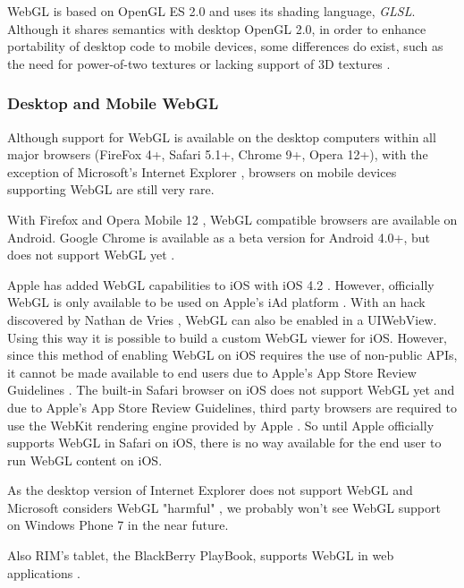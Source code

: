 \documentclass[12pt,journal,compsoc]{IEEEtran}
\begin{document}
WebGL is based on OpenGL ES 2.0 and uses its shading language, \textit{GLSL}. Although it shares semantics with desktop OpenGL 2.0, in order  to enhance portability of desktop code to mobile devices, some differences do exist, such as the need for power-of-two textures or lacking support of 3D textures \cite{KhronosDiff}.

\subsubsection{Desktop and Mobile WebGL}

Although support for WebGL is available on the desktop computers within all major browsers (FireFox 4+, Safari 5.1+, Chrome 9+, Opera 12+), with the exception of Microsoft's Internet Explorer \cite{Golubovic2011}, browsers on mobile devices supporting WebGL are still very rare.

With Firefox and Opera Mobile 12 \cite{opera12}, WebGL compatible browsers are available on Android. %
Google Chrome is available as a beta version for Android 4.0+, but does not support WebGL yet \cite{chromeForAndroid}.

\label{WebGLoniOS} Apple has added WebGL capabilities to iOS with iOS 4.2 \cite{deVries2011, iAdDocu}. However, officially WebGL is only available to be used on Apple’s iAd platform \cite{deVries2011, cmarrin2011}. With an hack discovered by Nathan de Vries \cite{deVries2011}, WebGL can also be enabled in a UIWebView. Using this way it is possible to build a custom WebGL viewer for iOS. However, since this method of enabling WebGL on iOS requires the use of non-public APIs, it cannot be made available to end users due to Apple's App Store Review Guidelines \cite{appstorereviewguidelines}. The built-in Safari browser on iOS does not support WebGL yet and due to Apple’s App Store Review Guidelines, third party browsers are required to use the WebKit rendering engine provided by Apple \cite{appstorereviewguidelines}. So until Apple officially supports WebGL in Safari on iOS, there is no way available for the end user to run WebGL content on iOS. 

As the desktop version of Internet Explorer does not support WebGL \cite{Golubovic2011} and Microsoft considers WebGL "harmful" \cite{microsoftWebGLHarmful}, we probably won’t see WebGL support on Windows Phone 7 in the near future. %

Also RIM's tablet, the BlackBerry PlayBook, supports WebGL in web applications \cite{BBPlayBook}. 
\end{document}
